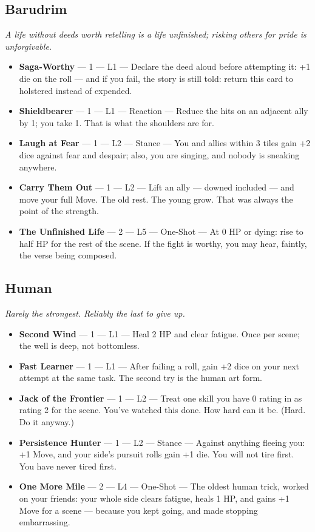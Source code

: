 \subsection{Barudrim}
\textit{A life without deeds worth retelling is a life unfinished; risking others for pride is unforgivable.}
\begin{itemize}
    \item \textbf{Saga-Worthy} --- 1 --- L1 --- Declare the deed aloud before attempting it: +1 die on the roll --- and if you fail, the story is still told: return this card to holstered instead of expended.
    \item \textbf{Shieldbearer} --- 1 --- L1 --- Reaction --- Reduce the hits on an adjacent ally by 1; you take 1. That is what the shoulders are for.
    \item \textbf{Laugh at Fear} --- 1 --- L2 --- Stance --- You and allies within 3 tiles gain +2 dice against fear and despair; also, you are singing, and nobody is sneaking anywhere.
    \item \textbf{Carry Them Out} --- 1 --- L2 --- Lift an ally --- downed included --- and move your full Move. The old rest. The young grow. That was always the point of the strength.
    \item \textbf{The Unfinished Life} --- 2 --- L5 --- One-Shot --- At 0 HP or dying: rise to half HP for the rest of the scene. If the fight is worthy, you may hear, faintly, the verse being composed.
\end{itemize}

\subsection{Human}
\textit{Rarely the strongest. Reliably the last to give up.}
\begin{itemize}
    \item \textbf{Second Wind} --- 1 --- L1 --- Heal 2 HP and clear fatigue. Once per scene; the well is deep, not bottomless.
    \item \textbf{Fast Learner} --- 1 --- L1 --- After failing a roll, gain +2 dice on your next attempt at the same task. The second try is the human art form.
    \item \textbf{Jack of the Frontier} --- 1 --- L2 --- Treat one skill you have 0 rating in as rating 2 for the scene. You've watched this done. How hard can it be. (Hard. Do it anyway.)
    \item \textbf{Persistence Hunter} --- 1 --- L2 --- Stance --- Against anything fleeing you: +1 Move, and your side's pursuit rolls gain +1 die. You will not tire first. You have never tired first.
    \item \textbf{One More Mile} --- 2 --- L4 --- One-Shot --- The oldest human trick, worked on your friends: your whole side clears fatigue, heals 1 HP, and gains +1 Move for a scene --- because you kept going, and made stopping embarrassing.
\end{itemize}


